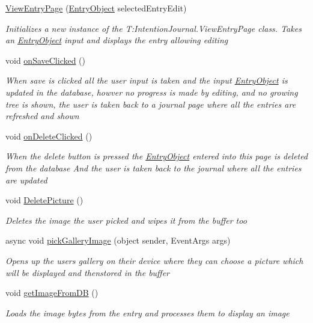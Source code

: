 \begin{DoxyCompactItemize}
\item 
\hyperlink{class_intention_journal_1_1_view_entry_page_aee0c9a7d98ef81043797789095a4c9e9}{View\+Entry\+Page} (\hyperlink{class_intention_journal_1_1_entry_object}{Entry\+Object} selected\+Entry\+Edit)
\begin{DoxyCompactList}\small\item\em Initializes a new instance of the T\+:\+Intention\+Journal.\+View\+Entry\+Page class. Takes an \hyperlink{class_intention_journal_1_1_entry_object}{Entry\+Object} input and displays the entry allowing editing \end{DoxyCompactList}\item 
void \hyperlink{class_intention_journal_1_1_view_entry_page_a42744fad9ae25e4b10a7a308e69545ce}{on\+Save\+Clicked} ()
\begin{DoxyCompactList}\small\item\em When save is clicked all the user input is taken and the input \hyperlink{class_intention_journal_1_1_entry_object}{Entry\+Object} is updated in the database, howver no progress is made by editing, and no growing tree is shown, the user is taken back to a journal page where all the entries are refreshed and shown \end{DoxyCompactList}\item 
void \hyperlink{class_intention_journal_1_1_view_entry_page_a9c8e210d72362c9a92d4f15fc1e2c523}{on\+Delete\+Clicked} ()
\begin{DoxyCompactList}\small\item\em When the delete button is pressed the \hyperlink{class_intention_journal_1_1_entry_object}{Entry\+Object} entered into this page is deleted from the database And the user is taken back to the journal where all the entries are updated \end{DoxyCompactList}\item 
void \hyperlink{class_intention_journal_1_1_view_entry_page_a23b72c3c73f876955f1b4ba32fbcd7f6}{Delete\+Picture} ()
\begin{DoxyCompactList}\small\item\em Deletes the image the user picked and wipes it from the buffer too \end{DoxyCompactList}\item 
async void \hyperlink{class_intention_journal_1_1_view_entry_page_a2f172c5cd22210438c6c671a8c59022b}{pick\+Gallery\+Image} (object sender, Event\+Args args)
\begin{DoxyCompactList}\small\item\em Opens up the users gallery on their device where they can choose a picture which will be displayed and thenstored in the buffer \end{DoxyCompactList}\item 
void \hyperlink{class_intention_journal_1_1_view_entry_page_ac49daa0a90b73c7c2ec011656cd56274}{get\+Image\+From\+DB} ()
\begin{DoxyCompactList}\small\item\em Loads the image bytes from the entry and processes them to display an image \end{DoxyCompactList}\end{DoxyCompactItemize}



